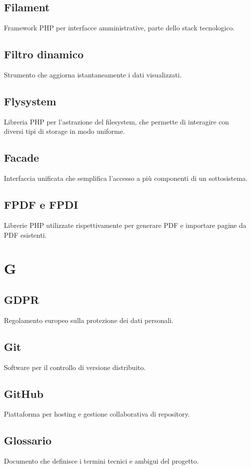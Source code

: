 \documentclass[a4paper,12pt]{article}
\begin{document}
\subsection{Filament}
Framework PHP per interfacce amministrative, parte dello stack tecnologico.

\subsection{Filtro dinamico}
Strumento che aggiorna istantaneamente i dati visualizzati.

\subsection{Flysystem}
Libreria PHP per l'astrazione del filesystem, che permette di interagire con diversi tipi di storage in modo uniforme.

\subsection{Facade}
Interfaccia unificata che semplifica l'accesso a più componenti di un sottosistema.

\subsection{FPDF e FPDI}
Librerie PHP utilizzate rispettivamente per generare PDF e importare pagine da PDF esistenti.

\section{G}
\subsection{GDPR}
Regolamento europeo sulla protezione dei dati personali.

\subsection{Git}
Software per il controllo di versione distribuito.

\subsection{GitHub}
Piattaforma per hosting e gestione collaborativa di repository.

\subsection{Glossario}
Documento che definisce i termini tecnici e ambigui del progetto.
\end{document}
